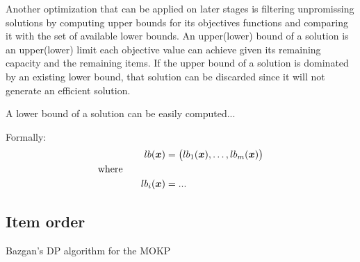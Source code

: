 Another optimization that can be applied on later stages is
filtering unpromissing solutions by computing upper bounds for its objectives
functions and comparing it with the set of available lower bounds.
An upper(lower) bound of a solution is an upper(lower) limit each objective
value can achieve given its remaining capacity and the remaining items.
If the upper bound of a solution is dominated by an existing lower bound,
that solution can be discarded since it will not generate an efficient solution.

A lower bound of a solution can be easily computed...

Formally:
\begin{displaymath}
\end{displaymath}
\begin{align*}
    lb(\boldsymbol{x}) &= \big(lb_1(\boldsymbol{x}),\ldots, lb_m(\boldsymbol{x}) \big) \\
    \text{where} \phantom{mmmmm} \\
    lb_i(\boldsymbol{x}) &= ...
\end{align*}

\subsection{Item order}

\begin{algorithm}
  \caption{Bazgan's DP algorithm for the MOKP}
  \label{alg:bazgan}
  
\end{algorithm}



